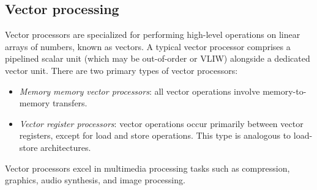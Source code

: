 \subsection{Vector processing}
Vector processors are specialized for performing high-level operations on linear arrays of numbers, known as vectors. 
A typical vector processor comprises a pipelined scalar unit (which may be out-of-order or VLIW) alongside a dedicated vector unit. 
There are two primary types of vector processors:
\begin{itemize}
    \item \textit{Memory memory vector processors}: all vector operations involve memory-to-memory transfers.
    \item \textit{Vector register processors}: vector operations occur primarily between vector registers, except for load and store operations. 
        This type is analogous to load-store architectures.
\end{itemize}
Vector processors excel in multimedia processing tasks such as compression, graphics, audio synthesis, and image processing.